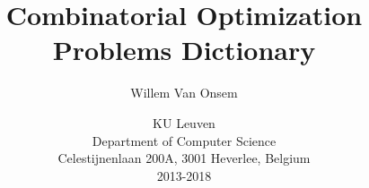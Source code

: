 \documentclass{../SharedData/dictionaryclass}
\title{Combinatorial Optimization Problems Dictionary}
\author{Willem Van Onsem}
\date{KU Leuven\\Department of Computer Science\\Celestijnenlaan 200A, 3001 Heverlee, Belgium\\2013-2018}
\begin{document}
\glsaddall
\printglossaries
\end{document}
